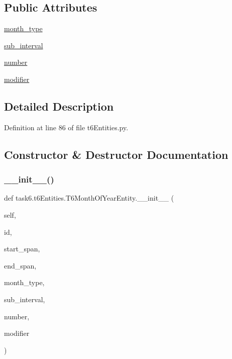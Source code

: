 \subsection*{Public Attributes}
\begin{DoxyCompactItemize}
\item 
\hyperlink{classtask6_1_1t6Entities_1_1T6MonthOfYearEntity_a48a849892eb9cbc6fce3833f059989a7}{month\+\_\+type}
\item 
\hyperlink{classtask6_1_1t6Entities_1_1T6MonthOfYearEntity_ac2823d70e532c8032939f67a84c5efbc}{sub\+\_\+interval}
\item 
\hyperlink{classtask6_1_1t6Entities_1_1T6MonthOfYearEntity_a6b6c3d56962c165f446304d82d06acb0}{number}
\item 
\hyperlink{classtask6_1_1t6Entities_1_1T6MonthOfYearEntity_a1720393c88572b80a70fd30bbccea2ab}{modifier}
\end{DoxyCompactItemize}


\subsection{Detailed Description}


Definition at line 86 of file t6\+Entities.\+py.



\subsection{Constructor \& Destructor Documentation}
\mbox{\label{classtask6_1_1t6Entities_1_1T6MonthOfYearEntity_aafc8822d1941f3f61d379af1cc34fa59}} 
\subsubsection{\texorpdfstring{\+\_\+\+\_\+init\+\_\+\+\_\+()}{\_\_init\_\_()}}
{\footnotesize\ttfamily def task6.\+t6\+Entities.\+T6\+Month\+Of\+Year\+Entity.\+\_\+\+\_\+init\+\_\+\+\_\+ (\begin{DoxyParamCaption}\item[{}]{self,  }\item[{}]{id,  }\item[{}]{start\+\_\+span,  }\item[{}]{end\+\_\+span,  }\item[{}]{month\+\_\+type,  }\item[{}]{sub\+\_\+interval,  }\item[{}]{number,  }\item[{}]{modifier }\end{DoxyParamCaption})}



